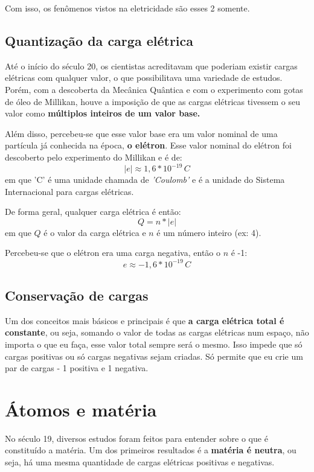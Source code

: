 \documentclass[12pt]{extarticle}
\newcommand{\<}{\langle}
\renewcommand{\>}{\rangle}
\theoremstyle{definition}
\begin{document}
Com isso, os fenômenos vistos na eletricidade são esses 2 somente.

\subsection{Quantização da carga elétrica}

Até o início do século 20, os cientistas acreditavam que poderiam existir cargas elétricas com qualquer valor, o que possibilitava uma variedade de estudos. Porém, com a descoberta da Mecânica Quântica e com o experimento com gotas de óleo de Millikan, houve a imposição de que as cargas elétricas tivessem o seu valor como \textbf{múltiplos inteiros de um valor base.} 

Além disso, percebeu-se que esse valor base era um valor nominal de uma partícula já conhecida na época, \textbf{o elétron}. Esse valor nominal do elétron foi descoberto pelo experimento do Millikan e é de:
\begin{equation}
    |e| \approx 1,6*10^{-19}\, C
\end{equation}
\noindent em que 'C' é uma unidade chamada de \textit{'Coulomb'} e é a unidade do Sistema Internacional para cargas elétricas.

De forma geral, qualquer carga elétrica é então:
\begin{equation}
    Q = n*|e|
\end{equation}
\noindent em que $Q$ é o valor da carga elétrica e $n$ é um número inteiro (ex: 4).

Percebeu-se que o elétron era uma carga negativa, então o $n$ é -1:
\begin{equation}
    e \approx -1,6*10^{-19}\,C
\end{equation}

\subsection{Conservação de cargas}
Um dos conceitos mais básicos e principais é que \textbf{a carga elétrica total é constante}, ou seja, somando o valor de todas as cargas elétricas num espaço, não importa o que eu faça, esse valor total sempre será o mesmo. Isso impede que só cargas positivas ou só cargas negativas sejam criadas. Só permite que eu crie um par de cargas - 1 positiva e 1 negativa.

\section{Átomos e matéria}
No século 19, diversos estudos foram feitos para entender sobre o que é constituído a matéria. Um dos primeiros resultados é a \textbf{matéria é neutra}, ou seja, há uma mesma quantidade de cargas elétricas positivas e negativas.
\end{document}
